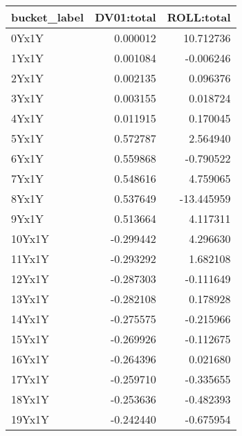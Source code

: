 \begin{tabular}{lrr}
\toprule
bucket_label & DV01:total & ROLL:total \\
\midrule
0Yx1Y & 0.000012 & 10.712736 \\
1Yx1Y & 0.001084 & -0.006246 \\
2Yx1Y & 0.002135 & 0.096376 \\
3Yx1Y & 0.003155 & 0.018724 \\
4Yx1Y & 0.011915 & 0.170045 \\
5Yx1Y & 0.572787 & 2.564940 \\
6Yx1Y & 0.559868 & -0.790522 \\
7Yx1Y & 0.548616 & 4.759065 \\
8Yx1Y & 0.537649 & -13.445959 \\
9Yx1Y & 0.513664 & 4.117311 \\
10Yx1Y & -0.299442 & 4.296630 \\
11Yx1Y & -0.293292 & 1.682108 \\
12Yx1Y & -0.287303 & -0.111649 \\
13Yx1Y & -0.282108 & 0.178928 \\
14Yx1Y & -0.275575 & -0.215966 \\
15Yx1Y & -0.269926 & -0.112675 \\
16Yx1Y & -0.264396 & 0.021680 \\
17Yx1Y & -0.259710 & -0.335655 \\
18Yx1Y & -0.253636 & -0.482393 \\
19Yx1Y & -0.242440 & -0.675954 \\
\bottomrule
\end{tabular}
